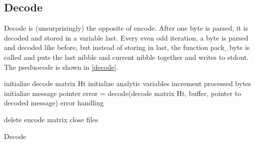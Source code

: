\documentclass[12pt]{article}
\begin{document}
\subsection{Decode}

Decode is (unsurprisingly) the opposite of encode. After one byte is
parsed, it is decoded and stored in a variable last.
Every even odd iteration, a byte is parsed and decoded like before,
but instead of storing in last, the function pack\_byte is called
and puts the last nibble and current nibble together and writes to
stdout.
The pseduocode is shown in \vref{decode}.

\begin{algorithm}
    initialize decode matrix Ht\;
    initialize analytic variables\;
     {
        increment processed bytes\;
        initialize message pointer\;
        error = decode(decode matrix Ht, buffer, pointer to decoded message)\;
		error handling\;
        \vspace{0.4em}
    }

    delete encode matrix\;
    close files\;
    \caption{Decode}\label{decode}
\end{algorithm}
\end{document}
